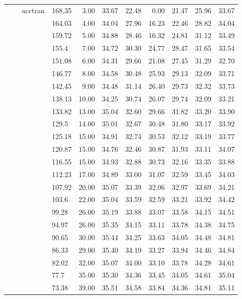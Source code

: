 \begin{longtable}{llllrrrrrrr}
   &  & acctran & 168.35 & 3.00 & 33.67 & 22.48 & 0.00 & 21.47 & 25.96 & 33.67 \\ 
   &  &  & 164.03 & 4.00 & 34.04 & 27.96 & 16.23 & 22.46 & 28.82 & 34.04 \\ 
   &  &  & 159.72 & 5.00 & 34.88 & 28.46 & 16.32 & 24.81 & 31.12 & 33.49 \\ 
   &  &  & 155.4 & 7.00 & 34.72 & 30.30 & 24.77 & 28.47 & 31.65 & 33.54 \\ 
   &  &  & 151.08 & 6.00 & 34.31 & 29.66 & 21.08 & 27.45 & 31.29 & 32.70 \\ 
   &  &  & 146.77 & 8.00 & 34.58 & 30.48 & 25.93 & 29.13 & 32.09 & 33.71 \\ 
   &  &  & 142.45 & 9.00 & 34.48 & 31.14 & 26.40 & 29.73 & 32.32 & 33.73 \\ 
   &  &  & 138.13 & 10.00 & 34.25 & 30.74 & 26.07 & 29.74 & 32.09 & 33.21 \\ 
   &  &  & 133.82 & 13.00 & 35.04 & 32.60 & 29.66 & 31.82 & 33.20 & 33.90 \\ 
   &  &  & 129.5 & 14.00 & 35.01 & 32.67 & 30.48 & 31.80 & 33.17 & 33.92 \\ 
   &  &  & 125.18 & 15.00 & 34.91 & 32.74 & 30.53 & 32.12 & 33.19 & 33.77 \\ 
   &  &  & 120.87 & 15.00 & 34.76 & 32.46 & 30.87 & 31.93 & 33.11 & 34.07 \\ 
   &  &  & 116.55 & 15.00 & 34.93 & 32.88 & 30.73 & 32.16 & 33.35 & 33.88 \\ 
   &  &  & 112.23 & 17.00 & 34.89 & 33.00 & 31.07 & 32.59 & 33.45 & 34.03 \\ 
   &  &  & 107.92 & 20.00 & 35.07 & 33.39 & 32.06 & 32.97 & 33.69 & 34.21 \\ 
   &  &  & 103.6 & 22.00 & 35.04 & 33.59 & 32.59 & 33.21 & 33.92 & 34.42 \\ 
   &  &  & 99.28 & 26.00 & 35.19 & 33.88 & 33.07 & 33.58 & 34.15 & 34.51 \\ 
   &  &  & 94.97 & 26.00 & 35.35 & 34.15 & 33.11 & 33.78 & 34.38 & 34.75 \\ 
   &  &  & 90.65 & 30.00 & 35.44 & 34.25 & 33.63 & 34.05 & 34.48 & 34.81 \\ 
   &  &  & 86.33 & 29.00 & 35.40 & 34.19 & 33.27 & 33.94 & 34.46 & 34.84 \\ 
   &  &  & 82.02 & 32.00 & 35.07 & 34.00 & 33.10 & 33.78 & 34.28 & 34.61 \\ 
   &  &  & 77.7 & 35.00 & 35.30 & 34.36 & 33.45 & 34.05 & 34.61 & 35.04 \\ 
   &  &  & 73.38 & 39.00 & 35.51 & 34.58 & 33.84 & 34.36 & 34.81 & 35.11 \\ 

\end{longtable}
